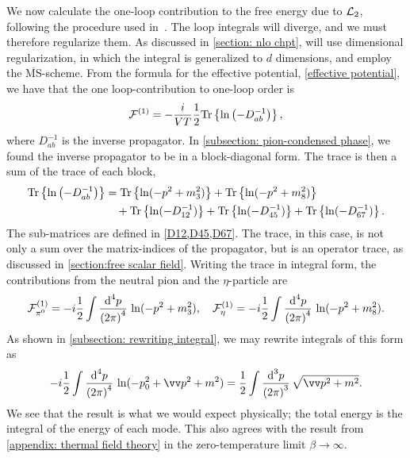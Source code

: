 We now calculate the one-loop contribution to the free energy due to $\mathcal{L}_2$, following the procedure used in~\autocite{adhikariTwoflavorChiralPerturbation2019,martinariaTwoflavorChiralPerturbation2020,adhikariQuarkPionAxial2021}.
The loop integrals will diverge, and we must therefore regularize them.
As discussed in \autoref{section: nlo chpt}, will use dimensional regularization, in which the integral is generalized to $d$ dimensions, and employ the $\overline{\mathrm{MS}}$-scheme.
From the formula for the effective potential, \autoref{effective potential}, we have that the one loop-contribution to one-loop order is 
%
\begin{equation}
    \mathcal{F}^{(1)}
    =
    - \frac{i}{V T} \frac{1}{2}
    \text{Tr} \left\{ \ln\left( - D_{ab}^{-1}\right) \right\},
\end{equation}
%
where $D_{ab}^{-1}$ is the inverse propagator.
In \autoref{subsection: pion-condensed phase}, we found the inverse propagator to be in a block-diagonal form.
The trace is then a sum of the trace of each block,
%
\begin{align}
    \nonumber
    \text{Tr} \left\{ \ln\left( - D_{ab}^{-1}\right) \right\}
    &=
    \text{Tr} \left\{ \ln(-p^2 + m_3^2) \right\}
    + \text{Tr} \left\{ \ln(-p^2 + m_8^2) \right\}
    \\&\quad
    + \text{Tr} \left\{ \ln(-D_{12}^{-1}) \right\}
    + \text{Tr} \left\{ \ln(-D_{45}^{-1}) \right\}
    + \text{Tr} \left\{ \ln(-D_{67}^{-1}) \right\}.
\end{align}
%
The sub-matrices are defined in \cref{D12,D45,D67}.
The trace, in this case, is not only a sum over the matrix-indices of the propagator, but is an operator trace, as discussed in \autoref{section:free scalar field}.
Writing the trace in integral form, the contributions from the neutral pion and the $\eta$-particle are
%
\begin{align}
    \mathcal{F}_{\pi^0}^{(1)}
    = -i\frac{1}{2} \int \frac{\text{d}^4 p}{{(2\pi)}^4}\, \ln(-p^2 + m_3^2), \quad
    \mathcal{F}_{\eta}^{(1)}
    = -i\frac{1}{2} \int \frac{\text{d}^4 p}{{(2\pi)}^4}\, \ln(-p^2 + m_8^2).
\end{align}
%
As shown in \autoref{subsection: rewriting integral}, we may rewrite integrals of this form as
%
\begin{equation}
    -i\frac{1}{2} \int \frac{\dd^4 p}{{(2\pi)}^4}\, \ln(-p_0^2 + \vv p^2 + m^2)
    = \frac{1}{2} \int  \frac{\dd^3 p}{{(2\pi)}^3 } \, \sqrt{\vv p^2 + m^2}.
\end{equation}
%
We see that the result is what we would expect physically; the total energy is the integral of the energy of each mode.
This also agrees with the result from \autoref{appendix: thermal field theory} in the zero-temperature limit $\beta \rightarrow \infty$.
